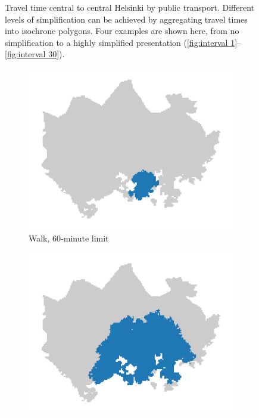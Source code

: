 \begin{figure}[H]
\begin{subfigure}[b]{0.4\textwidth}
	\end{subfigure}%
	\caption{
		Travel time central to central Helsinki by public transport.
		Different levels of simplification can be achieved by
		aggregating travel times into isochrone polygons.
		Four examples are shown here, from no simplification
		to a highly simplified presentation
		(\ref{fig:interval 1}--\ref{fig:interval 30}).
	}
	\label{fig:isochrone intervals}
\end{figure}

\begin{figure}[H]
	\centering
	\begin{subfigure}[b]{0.5\textwidth}
		\includegraphics[width=\textwidth]{visual/figures/ttm/tt_limit_walk}
		\caption{Walk, 60-minute limit}
		\label{fig:limit walk}
	\end{subfigure}%
	\hfill
	\begin{subfigure}[b]{0.5\textwidth}
		\includegraphics[width=\textwidth]{visual/figures/ttm/tt_limit_bike}

\end{subfigure}
\end{figure}
